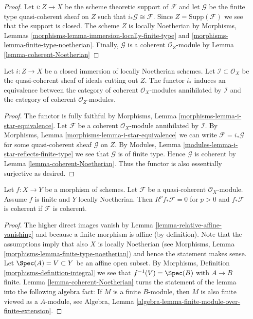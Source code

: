 \begin{proof}
Let $i : Z \to X$ be the scheme theoretic support of $\mathcal{F}$ and
let $\mathcal{G}$ be the finite type quasi-coherent sheaf on $Z$
such that $i_*\mathcal{G} \cong \mathcal{F}$.
Since $Z = \text{Supp}(\mathcal{F})$ we see that the support is closed.
The scheme $Z$ is locally Noetherian by
Morphisms, Lemmas \ref{morphisms-lemma-immersion-locally-finite-type}
and \ref{morphisms-lemma-finite-type-noetherian}.
Finally, $\mathcal{G}$ is a coherent $\mathcal{O}_Z$-module by
Lemma \ref{lemma-coherent-Noetherian}
\end{proof}

\begin{lemma}
\label{lemma-i-star-equivalence}
Let $i : Z \to X$ be a closed immersion of locally Noetherian schemes.
Let $\mathcal{I} \subset \mathcal{O}_X$ be the quasi-coherent sheaf of ideals
cutting out $Z$. The functor $i_*$ induces an equivalence between the
category of coherent $\mathcal{O}_X$-modules annihilated by $\mathcal{I}$
and the category of coherent $\mathcal{O}_Z$-modules.
\end{lemma}

\begin{proof}
The functor is fully faithful by
Morphisms, Lemma \ref{morphisms-lemma-i-star-equivalence}.
Let $\mathcal{F}$ be a coherent $\mathcal{O}_X$-module
annihilated by $\mathcal{I}$. By
Morphisms, Lemma \ref{morphisms-lemma-i-star-equivalence}
we can write $\mathcal{F} = i_*\mathcal{G}$ for some quasi-coherent
sheaf $\mathcal{G}$ on $Z$. By
Modules, Lemma \ref{modules-lemma-i-star-reflects-finite-type}
we see that $\mathcal{G}$ is of finite type.
Hence $\mathcal{G}$ is coherent by
Lemma \ref{lemma-coherent-Noetherian}.
Thus the functor is also essentially surjective as desired.
\end{proof}

\begin{lemma}
\label{lemma-finite-pushforward-coherent}
Let $f : X \to Y$ be a morphism of schemes.
Let $\mathcal{F}$ be a quasi-coherent $\mathcal{O}_X$-module.
Assume $f$ is finite and $Y$ locally Noetherian.
Then $R^pf_*\mathcal{F} = 0$ for $p > 0$ and
$f_*\mathcal{F}$ is coherent if $\mathcal{F}$ is coherent.
\end{lemma}

\begin{proof}
The higher direct images vanish by
Lemma \ref{lemma-relative-affine-vanishing} and because
a finite morphism is affine (by definition).
Note that the assumptions imply that also $X$ is locally Noetherian
(see Morphisms, Lemma \ref{morphisms-lemma-finite-type-noetherian})
and hence the statement makes sense.
Let $\Spec(A) = V \subset Y$ be an affine open subset.
By Morphisms, Definition \ref{morphisms-definition-integral}
we see that $f^{-1}(V) = \Spec(B)$ with $A \to B$ finite.
Lemma \ref{lemma-coherent-Noetherian}
turns the statement of the lemma into the following algebra
fact: If $M$ is a finite $B$-module, then $M$ is also finite
viewed as a $A$-module, see
Algebra, Lemma \ref{algebra-lemma-finite-module-over-finite-extension}.
\end{proof}

